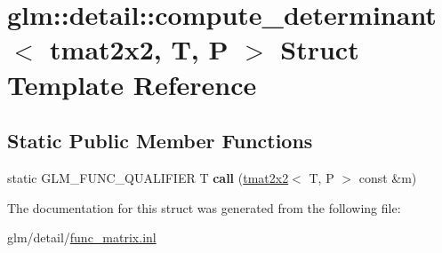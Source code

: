 \hypertarget{structglm_1_1detail_1_1compute__determinant_3_01tmat2x2_00_01T_00_01P_01_4}{\section{glm\-:\-:detail\-:\-:compute\-\_\-determinant$<$ tmat2x2, T, P $>$ Struct Template Reference}
\label{structglm_1_1detail_1_1compute__determinant_3_01tmat2x2_00_01T_00_01P_01_4}
}
\subsection*{Static Public Member Functions}
\begin{DoxyCompactItemize}
\item 
\hypertarget{structglm_1_1detail_1_1compute__determinant_3_01tmat2x2_00_01T_00_01P_01_4_a515be152fcac2d176e8209df4fb04971}{static G\-L\-M\-\_\-\-F\-U\-N\-C\-\_\-\-Q\-U\-A\-L\-I\-F\-I\-E\-R T {\bfseries call} (\hyperlink{structglm_1_1tmat2x2}{tmat2x2}$<$ T, P $>$ const \&m)}\label{structglm_1_1detail_1_1compute__determinant_3_01tmat2x2_00_01T_00_01P_01_4_a515be152fcac2d176e8209df4fb04971}

\end{DoxyCompactItemize}


The documentation for this struct was generated from the following file\-:\begin{DoxyCompactItemize}
\item 
glm/detail/\hyperlink{func__matrix_8inl}{func\-\_\-matrix.\-inl}\end{DoxyCompactItemize}
